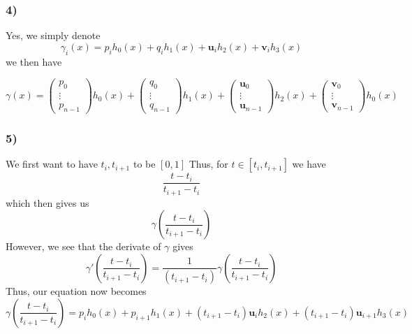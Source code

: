 \subsubsection{4)}
Yes, we simply denote 
\[
    \gamma_i(x) = p_ih_0(x) + q_ih_1(x) + \boldsymbol{u}_ih_2(x)+ \boldsymbol{v}_ih_3(x)
\]
we then have 

\[
    \gamma(x) = 
    \begin{pmatrix*}
        p_0 \\
        \vdots \\
        p_{n-1}
    \end{pmatrix*}h_0(x) + 
    \begin{pmatrix*}
        q_0 \\
        \vdots \\
        q_{n-1}
    \end{pmatrix*}h_1(x) + 
    \begin{pmatrix*}
        \boldsymbol{u} _0 \\
        \vdots \\
        \boldsymbol{u} _{n-1}
    \end{pmatrix*}h_2(x) + 
    \begin{pmatrix*}
        \boldsymbol{v}_0  \\
        \vdots \\
        \boldsymbol{v}_{n-1} 
    \end{pmatrix*}h_0(x) 
\]

\subsubsection{5)}
We first want to have $ t_i, t_{i+1}  $ to be $ [0,1] $
Thus, for $ t \in [t_i, t_{i+1}]  $ we have 
\[
    \frac{ t - t_i }{ t_{i+1} - t_i } 
\]
which then gives us 
\[
\gamma\left( \frac{ t - t_i }{ t_{i+1} - t_i }\right) 
\]
However, we see that the derivate of $ \gamma  $ gives 
\[
    \gamma'\left( \frac{ t - t_i }{ t_{i+1} - t_i }\right) = \frac{ 1  }{ 
    \left( t_{i+1} - t_i \right) } \gamma \left( \frac{ t - t_i }{ t_{i+1} - t_i } \right)  
\]
Thus, our equation now becomes 
\[
\gamma \left( \frac{ t - t_i }{ t_{i+1} - t_i }\right) = 
p_ih_0(x) + p_{i+1}h_1(x) + \left( t_{i+1} - t_i \right) \boldsymbol{u}_ih_2(x) 
+ \left(  t_{i+1} - t_i \right) \boldsymbol{u}_{i+1}h_3(x) 
\]

